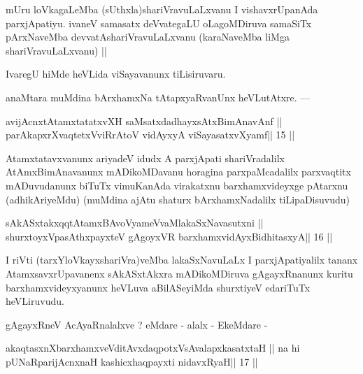 \begin{artha}
mUru loVkagaLeMba (sUthxla)shariVravuLaLxvanu I vishavxrUpanAda parxjApatiyu. ivaneV samasatx deVvategaLU oLagoMDiruva samaSiTx pArxNaveMba devvatAshariVravuLaLxvanu (karaNaveMba liMga shariVravuLaLxvanu) ||
\end{artha} 
 
\begin{artha}
IvaregU hiMde heVLida viSayavanunx tiLisiruvaru.
\end{artha} 
 
 
\begin{artha}
anaMtara muMdina bArxhamxNa tAtapxyaRvanUnx heVLutAtxre. ---
\end{artha}

\begin{shl}
avijAcnxtAtamxtatatxvXH saMsatxdadhayxsAtxBimAnavAnf ||
parAkapxrXvaqtetxVviRrAtoV vidAyxyA viSayasatxvXyamf\hfill || 15 ||
\end{shl}

\begin{artha}
Atamxtatavxvanunx ariyadeV idudx A parxjApati shariVradalilx AtAmxBimAnavanunx mADikoMDavanu horagina parxpaMcadalilx parxvaqtitx mADuvudanunx biTuTx vimuKanAda virakatxnu barxhamxvideyxge pAtarxnu (adhikAriyeMdu) (muMdina ajAtu shaturx bArxhamxNadalilx tiLipaDisuvudu)
\end{artha}

\begin{shl}
sAkASxtakxqqtAtamxBAvoV\s yameVvaMlakaSxNavasutxni ||
shurxtoyxVpasAthxpayxteV gAgoyxVR barxhamxvidAyxBidhitasxyA\hfill || 16 ||
\end{shl}

\begin{artha}
I riVti (tarxYloVkayxshariVra)veMba lakaSxNavuLaLx I parxjApatiyalilx tananx AtamxsavxrUpavanenx sAkASxtAkxra mADikoMDiruva gAgayxRnanunx kuritu barxhamxvideyxyanunx heVLuva aBilASeyiMda shurxtiyeV edariTuTx heVLiruvudu.
\end{artha} 
 
\begin{artha}
gAgayxRneV AcAyaRnalalxve ? eMdare - alalx - EkeMdare -
\end{artha}

\begin{shl}
akaqtasxnXbarxhamxveVditAvxdaqpotxV\s sAvalapxkasatxtaH ||
na hi pUNaRparijAcnxnaH kashicxhaqpayxti nidavxRyaH\hfill || 17 ||
\end{shl}


